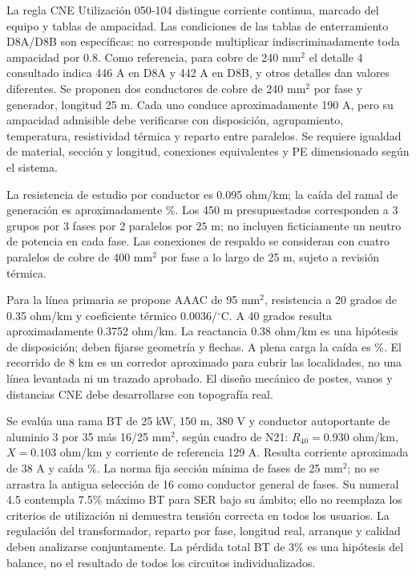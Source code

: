 La regla CNE Utilización 050-104 distingue corriente continua, marcado del equipo y tablas de ampacidad. Las condiciones de las tablas de enterramiento D8A/D8B son específicas: no corresponde multiplicar indiscriminadamente toda ampacidad por 0.8. Como referencia, para cobre de 240 \(\mathrm{mm^2}\) el detalle 4 consultado indica 446 A en D8A y 442 A en D8B, y otros detalles dan valores diferentes. Se proponen dos conductores de cobre de 240 \(\mathrm{mm^2}\) por fase y generador, longitud 25 m. Cada uno conduce aproximadamente 190 A, pero su ampacidad admisible debe verificarse con disposición, agrupamiento, temperatura, resistividad térmica y reparto entre paralelos. Se requiere igualdad de material, sección y longitud, conexiones equivalentes y PE dimensionado según el sistema.

La resistencia de estudio por conductor es 0.095 ohm/km; la caída del ramal de generación es aproximadamente \%. Los 450 m presupuestados corresponden a \(3\) grupos por \(3\) fases por \(2\) paralelos por \(25\) m; no incluyen ficticiamente un neutro de potencia en cada fase. Las conexiones de respaldo se consideran con cuatro paralelos de cobre de 400 \(\mathrm{mm^2}\) por fase a lo largo de 25 m, sujeto a revisión térmica.

Para la línea primaria se propone AAAC de 95 \(\mathrm{mm^2}\), resistencia a 20 grados de 0.35 ohm/km y coeficiente térmico 0.0036/\(\!^\circ\mathrm{C}\). A 40 grados resulta aproximadamente 0.3752 ohm/km. La reactancia 0.38 ohm/km es una hipótesis de disposición; deben fijarse geometría y flechas. A plena carga la caída es \%. El recorrido de 8 km es un corredor aproximado para cubrir las localidades, no una línea levantada ni un trazado aprobado. El diseño mecánico de postes, vanos y distancias CNE debe desarrollarse con topografía real.

Se evalúa una rama BT de 25 kW, 150 m, 380 V y conductor autoportante de aluminio 3 por 35 más 16/25 \(\mathrm{mm^2}\), según cuadro de N21: \(R_{40}=0.930\) ohm/km, \(X=0.103\) ohm/km y corriente de referencia 129 A. Resulta corriente aproximada de 38 A y caída \%. La norma fija sección mínima de fases de 25 \(\mathrm{mm^2}\); no se arrastra la antigua selección de 16 como conductor general de fases. Su numeral 4.5 contempla 7.5\% máximo BT para SER bajo su ámbito; ello no reemplaza los criterios de utilización ni demuestra tensión correcta en todos los usuarios. La regulación del transformador, reparto por fase, longitud real, arranque y calidad deben analizarse conjuntamente. La pérdida total BT de 3\% es una hipótesis del balance, no el resultado de todos los circuitos individualizados.

